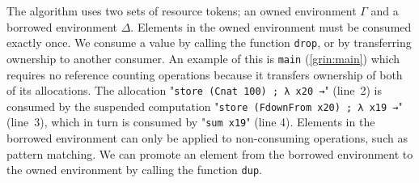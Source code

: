 \documentclass[9pt, twocolumn]{article}
\newcommand{\refp}[1]{(\ref{#1})}
\begin{document}
The algorithm uses two sets of resource tokens; an owned environment $\Gamma$ and a borrowed environment $\Delta$. 
Elements in the owned environment must be consumed exactly once. 
We consume a value by calling the function \lstinline{drop}, or by transferring ownership to another consumer.
An example of this is \lstinline{main} \refp{grin:main} which requires no reference counting operations because it transfers ownership of both of its allocations.
The allocation "\lstinline{store (Cnat 100) ; λ x20 →}" \mbox{(line 2)} is consumed by the suspended computation "\lstinline{store (FdownFrom x20) ; λ x19 →}" \mbox{(line 3)}, which in turn is consumed by "\lstinline{sum x19}" (line 4).
Elements in the borrowed environment can only be applied to non-consuming operations, such as pattern matching. 
We can promote an element from the borrowed environment to the owned environment by calling the function \lstinline{dup}.
\end{document}
